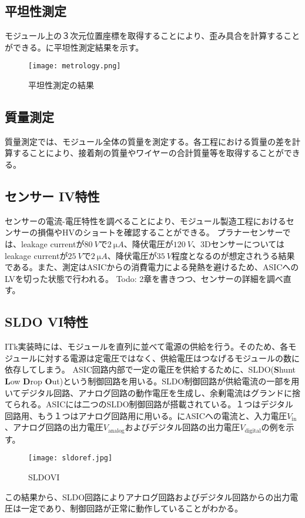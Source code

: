 \subsection{平坦性測定}

モジュール上の３次元位置座標を取得することにより、歪み具合を計算することができる。に平坦性測定結果を示す。

\begin{figure}[tbp]
  \centering
  \texttt{[image: metrology.png]}
  \caption[平坦性測定の結果]{平坦性測定の結果 }
  \label{fig:metrology}
\end{figure}


\subsection{質量測定}

質量測定では、モジュール全体の質量を測定する。各工程における質量の差を計算することにより、接着剤の質量やワイヤーの合計質量等を取得することができる。


\subsection{センサー IV特性}

センサーの電流-電圧特性を調べることにより、モジュール製造工程におけるセンサーの損傷やHVのショートを確認することができる。
プラナーセンサーでは、leakage currentが$80\ \si{V}$で$2\ \si{\micro A}$、降伏電圧が$120\ \si{V}$、3Dセンサーについてはleakage currentが$25\ \si{V}$で$2\ \si{\micro A}$、降伏電圧が$35\ \si{V}$程度となるのが想定されうる結果である。また、測定はASICからの消費電力による発熱を避けるため、ASICへのLVを切った状態で行われる。
Todo: 2章を書きつつ、センサーの詳細を調べ直す。

\subsection{SLDO VI特性}

ITk実装時には、モジュールを直列に並べて電源の供給を行う。そのため、各モジュールに対する電源は定電圧ではなく、供給電圧はつなげるモジュールの数に依存してしまう。
ASIC回路内部で一定の電圧を供給するために、SLDO(\textbf{S}hunt \textbf{L}ow \textbf{D}rop \textbf{O}ut)という制御回路を用いる。SLDO制御回路が供給電流の一部を用いてデジタル回路、アナログ回路の動作電圧を生成し、余剰電流はグランドに捨てられる。ASICには二つのSLDO制御回路が搭載されている。１つはデジタル回路用、もう１つはアナログ回路用に用いる。にASICへの電流と、入力電圧$V_\mathrm{in}$、アナログ回路の出力電圧$V_\mathrm{analog}$およびデジタル回路の出力電圧$V_\mathrm{digital}$の例を示す。
\begin{figure}[tbp]
  \centering
  \texttt{[image: sldoref.jpg]}
  \caption[SLDOVI]{SLDOVI}
  \label{fig:sldoref}
\end{figure}
この結果から、SLDO回路によりアナログ回路およびデジタル回路からの出力電圧は一定であり、制御回路が正常に動作していることがわかる。


